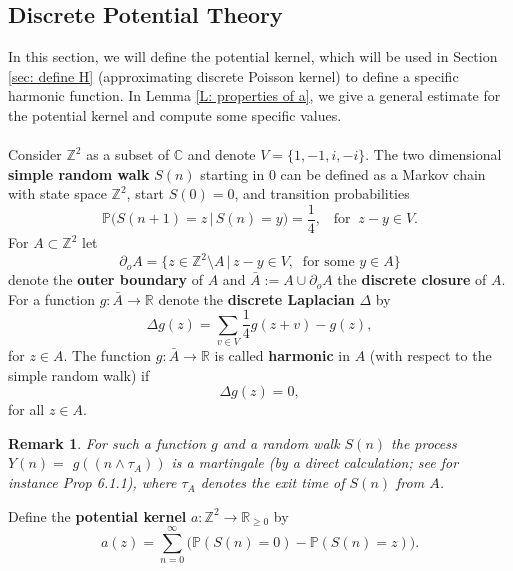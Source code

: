\documentclass[11pt]{article}
\numberwithin{equation}{section}
\newtheorem*{remark}{Remark}
\begin{document}
\subsection{Discrete Potential Theory} 
\label{sec: discrete potential theory}
In this section, we will define the potential kernel, 
which will be used in 
Section \ref{sec: define H} (approximating discrete Poisson kernel) 
to define a specific harmonic function. 
In Lemma \ref{L: properties of a}, we give a 
general estimate for the potential kernel and 
compute some specific values. \\~\\
Consider $\mathbb{Z}^2$ as a subset of $\mathbb{C}$ 
and denote $V = \{1, -1, i, -i\} \label{D: V}$. 
The two dimensional \textbf{simple random walk} $S(n)$
starting in $0$ can be defined
as a Markov chain with state space $\mathbb{Z}^2$, 
start $S(0) = 0$, and transition probabilities 
\begin{equation}
  \label{D: random walk}
  \nonumber
  \mathbb{P}\big( S(n+1) = z \, \big| \, S(n) = y \big) = \frac{1}{4},
  \;\;\;\text{for}\;\; z-y \in V.
\end{equation}  
For $A \subset \mathbb{Z}^2$ let 
$$
\partial_o A = \{z \in \mathbb{Z} ^2 \setminus A \, | \,
 z - y \in V,  \;\; \text{for some } y \in A  \}
$$
denote the \textbf{outer boundary} of $A$ 
and $\bar{A} := A \cup \partial_o A$ the 
\textbf{discrete closure} of $A$.
For a function $g: \bar{A} \rightarrow \mathbb{R}$ 
denote the \textbf{discrete Laplacian} $\Delta$ by 
\begin{equation}
  \label{D: discrete Lapacian}
  \nonumber
  \Delta g (z) = 
  \sum_{v \in V} \frac{1}{4} g(z + v) - g(z),
\end{equation} 
for $z \in A$. 
The function $g : \bar{A} \rightarrow \mathbb{R}$
is called \textbf{harmonic} in $A$
(with respect to the simple random walk) if 
\begin{equation}\label{D: discrete harmonic}
  \Delta g (z) = 0,
\end{equation}
for all $z \in A$.

\begin{remark}
  For such a function $g$ and a random walk $S(n)$  
  the process \hbox{$Y(n)=$} \hbox{$g((n \land \tau_A))$}
  is a martingale (by a direct calculation; see for instance \cite{lawler} Prop 6.1.1), 
  where \mbox{$\tau_A$} denotes the exit time of $S(n)$ from $A$.
\end{remark}

Define the \textbf{potential kernel} 
$a: \mathbb{Z}^2 \rightarrow \mathbb{R}_{\geq 0}$ 
by 
\begin{equation}\label{D: a}
a(z) = \sum_{n=0}^{\infty} 
   \big( \mathbb{P}(S(n) = 0) - \mathbb{P}(S(n) = z) \big). 
\end{equation}
\end{document}
